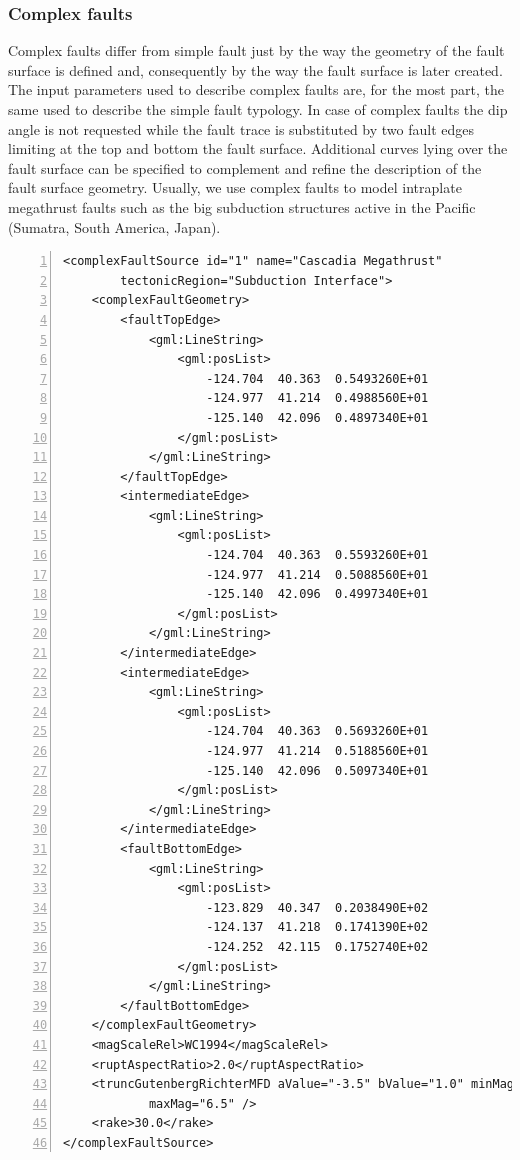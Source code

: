 \subsubsection{Complex faults}
%
Complex faults differ from simple fault just by the way the geometry of 
the fault surface is defined and, consequently by the way the fault 
surface is later created. 
The input parameters used to describe complex faults are, for the most 
part, the same used to describe the simple fault typology. 
In case of complex faults the dip angle is not requested while the fault
trace is substituted by two fault edges limiting at the top and bottom 
the fault surface. Additional curves lying over the fault surface can be 
specified to complement and refine the description of the fault surface 
geometry.
%
Usually, we use complex faults to model intraplate megathrust faults such 
as the big subduction structures active in the Pacific (Sumatra, South 
America, Japan).
\begin{Verbatim}[frame=single, commandchars=\\\{\}, fontsize=\footnotesize,
    numbers=left, numbersep=2pt]
<complexFaultSource id="1" name="Cascadia Megathrust" 
		tectonicRegion="Subduction Interface">
    <complexFaultGeometry>
        <faultTopEdge>
            <gml:LineString>
                <gml:posList>
                    -124.704  40.363  0.5493260E+01
                    -124.977  41.214  0.4988560E+01
                    -125.140  42.096  0.4897340E+01
                </gml:posList>
            </gml:LineString>
        </faultTopEdge>
        <intermediateEdge>
            <gml:LineString>
                <gml:posList>
                    -124.704  40.363  0.5593260E+01
                    -124.977  41.214  0.5088560E+01
                    -125.140  42.096  0.4997340E+01
                </gml:posList>
            </gml:LineString>
        </intermediateEdge>
        <intermediateEdge>
            <gml:LineString>
                <gml:posList>
                    -124.704  40.363  0.5693260E+01
                    -124.977  41.214  0.5188560E+01
                    -125.140  42.096  0.5097340E+01
                </gml:posList>
            </gml:LineString>
        </intermediateEdge>
        <faultBottomEdge>
            <gml:LineString>
                <gml:posList>
                    -123.829  40.347  0.2038490E+02
                    -124.137  41.218  0.1741390E+02
                    -124.252  42.115  0.1752740E+02
                </gml:posList>
            </gml:LineString>
        </faultBottomEdge>
    </complexFaultGeometry>
    <magScaleRel>WC1994</magScaleRel>
    <ruptAspectRatio>2.0</ruptAspectRatio>
    <truncGutenbergRichterMFD aValue="-3.5" bValue="1.0" minMag="5.0" 
			maxMag="6.5" />
    <rake>30.0</rake>
</complexFaultSource>
\end{Verbatim}
%
